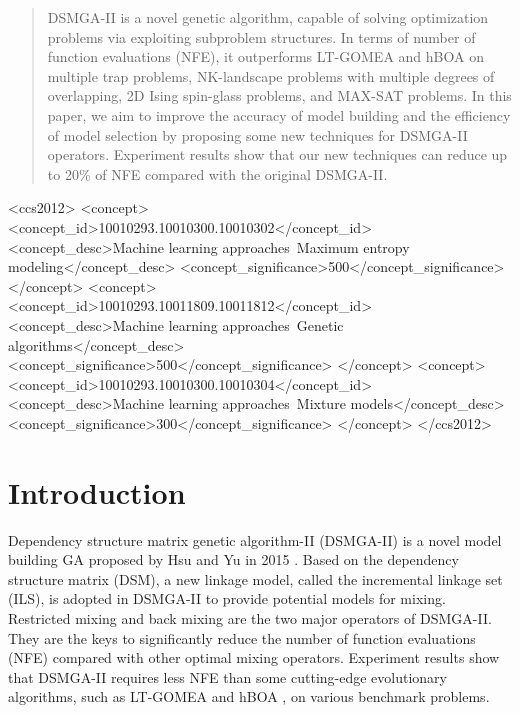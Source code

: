 \documentclass{sig-alternate-05-2015}
\begin{document}
\maketitle
\begin{abstract}
DSMGA-II is a novel genetic algorithm, capable of solving optimization problems via exploiting subproblem structures. In terms of number of function evaluations (NFE), it outperforms LT-GOMEA and hBOA on multiple trap problems, NK-landscape problems with multiple degrees of overlapping, 2D Ising spin-glass problems, and MAX-SAT problems. In this paper, we aim to improve the accuracy of model building and the efficiency of model selection by proposing some new techniques for DSMGA-II operators. Experiment results show that our new techniques can reduce up to 20\% of NFE compared with the original DSMGA-II.
\end{abstract}


%
%
\begin{CCSXML}
<ccs2012>
<concept>
<concept_id>10010293.10010300.10010302</concept_id>
<concept_desc>Machine learning approaches~Maximum entropy modeling</concept_desc>
<concept_significance>500</concept_significance>
</concept>
<concept>
<concept_id>10010293.10011809.10011812</concept_id>
<concept_desc>Machine learning approaches~Genetic algorithms</concept_desc>
<concept_significance>500</concept_significance>
</concept>
<concept>
<concept_id>10010293.10010300.10010304</concept_id>
<concept_desc>Machine learning approaches~Mixture models</concept_desc>
<concept_significance>300</concept_significance>
</concept>
</ccs2012>
\end{CCSXML}

%
%

%
%
\printccsdesc


\section{Introduction}

Dependency structure matrix genetic algorithm-II (DSMGA-II) is a novel model building GA proposed by Hsu and Yu in 2015 \cite{hsu:DSMGA2}.
Based on the dependency structure matrix (DSM), a new linkage model, called the incremental linkage set (ILS), is adopted in DSMGA-II to provide potential models for mixing. Restricted mixing and back mixing are the two major operators of DSMGA-II. They are the keys to significantly reduce the number of function evaluations (NFE) compared with other optimal mixing operators. Experiment results show that DSMGA-II requires less NFE than some cutting-edge evolutionary algorithms, such as LT-GOMEA \cite{bosman:LT-GOMEA} and hBOA \cite{pelikan:hBOA}, on various benchmark problems. 
\end{document}
